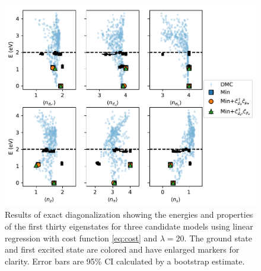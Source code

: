 \documentclass{article}
\begin{document}
\begin{figure}[H]
\centering
\includegraphics[width=0.7\linewidth]{../qwalk/old/ub3lyp_s1_/analysis/figs/final_ed.pdf}
\caption{Results of exact diagonalization showing the energies and properties of the first thirty eigenstates for three candidate models using linear regression with cost function \ref{eq:cost} and $\lambda = 20$. The ground state and first excited state are colored and have enlarged markers for clarity. Error bars are 95\% CI calculated by a bootstrap estimate.}
\label{fig:FinalED}
\end{figure}	
\end{document}
